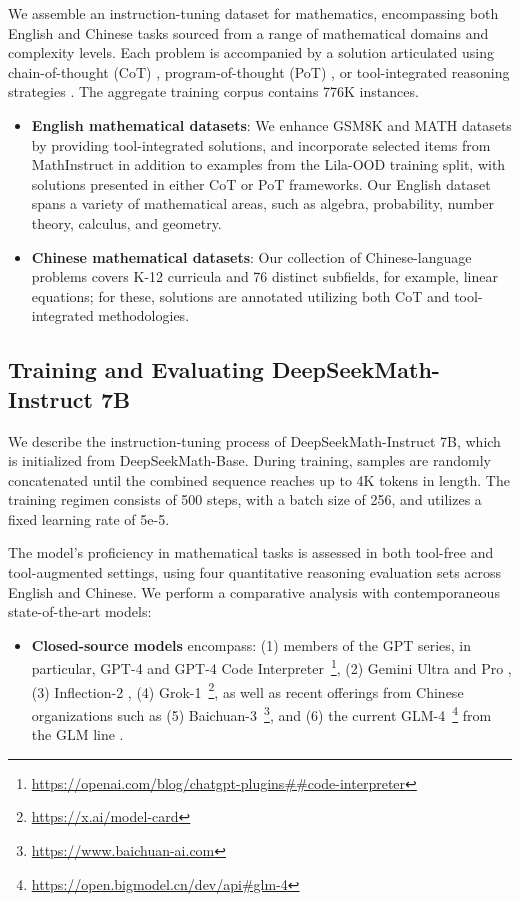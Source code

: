 We assemble an instruction-tuning dataset for mathematics, encompassing both English and Chinese tasks sourced from a range of mathematical domains and complexity levels. Each problem is accompanied by a solution articulated using chain-of-thought (CoT) \citep{cot}, program-of-thought (PoT) \citep{pot,pal}, or tool-integrated reasoning strategies \citep{tora}. The aggregate training corpus contains 776K instances.

\begin{itemize}[topsep=0pt]
    \item \textbf{English mathematical datasets}: We enhance GSM8K and MATH datasets by providing tool-integrated solutions, and incorporate selected items from MathInstruct \citep{MathInstruct} in addition to examples from the Lila-OOD \citep{lila} training split, with solutions presented in either CoT or PoT frameworks. Our English dataset spans a variety of mathematical areas, such as algebra, probability, number theory, calculus, and geometry.
    \item \textbf{Chinese mathematical datasets}: Our collection of Chinese-language problems covers K-12 curricula and 76 distinct subfields, for example, linear equations; for these, solutions are annotated utilizing both CoT and tool-integrated methodologies.
\end{itemize}

\subsection{Training and Evaluating DeepSeekMath-Instruct 7B}

We describe the instruction-tuning process of DeepSeekMath-Instruct 7B, which is initialized from DeepSeekMath-Base. During training, samples are randomly concatenated until the combined sequence reaches up to 4K tokens in length. The training regimen consists of 500 steps, with a batch size of 256, and utilizes a fixed learning rate of 5e-5.

The model's proficiency in mathematical tasks is assessed in both tool-free and tool-augmented settings, using four quantitative reasoning evaluation sets across English and Chinese. We perform a comparative analysis with contemporaneous state-of-the-art models:

\begin{itemize}[topsep=0pt]
    \item \textbf{Closed-source models} encompass: (1) members of the GPT series, in particular, GPT-4 \citep{gpt4} and GPT-4 Code Interpreter~\footnote{\url{https://openai.com/blog/chatgpt-plugins\#\#code-interpreter}}, (2) Gemini Ultra and Pro \citep{gemini}, (3) Inflection-2 \citep{inflection-2}, (4) Grok-1~\footnote{\url{https://x.ai/model-card}}, as well as recent offerings from Chinese organizations such as (5) Baichuan-3~\footnote{\url{https://www.baichuan-ai.com}}, and (6) the current GLM-4~\footnote{\url{https://open.bigmodel.cn/dev/api\#glm-4}} from the GLM line \citep{glm}.
\end{itemize}

